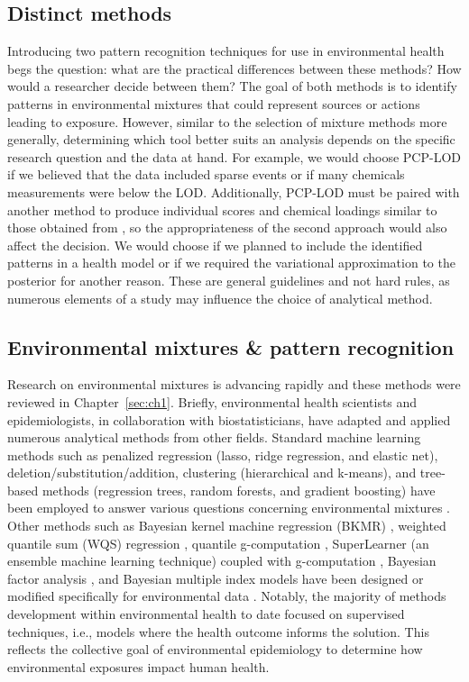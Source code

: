 \subsection{Distinct methods}\label{sec:difference}
Introducing two pattern recognition techniques for use in environmental health begs the question: what are the practical differences between these methods? How would a researcher decide between them? The goal of both methods is to identify patterns in environmental mixtures that could represent sources or actions leading to exposure.  However, similar to the selection of mixture methods more generally, determining which tool better suits an analysis depends on the specific research question and the data at hand. For example, we would choose PCP-LOD if we believed that the data included sparse events or if many chemicals measurements were below the LOD. Additionally, PCP-LOD must be paired with another method to produce individual scores and chemical loadings similar to those obtained from \bnmfc, so the appropriateness of the second approach would also affect the decision. We would choose \bnmf if we planned to include the identified patterns in a health model or if we required the variational approximation to the posterior for another reason. These are general guidelines and not hard rules, as numerous elements of a study may influence the choice of analytical method.

\subsection{Environmental mixtures \& pattern recognition}
\label{sec:mixtures}
Research on environmental mixtures is advancing rapidly and these methods were reviewed in Chapter~\ref{sec:ch1}. Briefly, environmental health scientists and epidemiologists, in collaboration with biostatisticians, have adapted and applied numerous analytical methods from other fields. Standard machine learning methods such as penalized regression (lasso, ridge regression, and elastic net), deletion/substitution/addition, clustering (hierarchical and k-means), and tree-based methods (regression trees, random forests, and gradient boosting) have been employed to answer various questions concerning environmental mixtures \citep{tanner2020environmental, oskar2020machine, choirat2019data, vuong2020chemical, lazarevic2019statistical, coker2018multi, hamra2018environmental, huang2018cumulative, stafoggia2017statistical}. Other methods such as Bayesian kernel machine regression (BKMR) \citep{bobb2014bayesian, bobb2018statistical}, weighted quantile sum (WQS) regression \citep{carrico15}, quantile g-computation \citep{keil2020quantile}, SuperLearner (an ensemble machine learning technique) coupled with g-computation \citep{oulhote2019joint}, Bayesian factor analysis \citep{ferrari2020bayesian, bhattacharya2011sparse}, and Bayesian multiple index models have been designed or modified specifically for environmental data \citep{mcgee2021bayesian}. Notably, the majority of methods development within environmental health to date focused on supervised techniques, i.e., models where the health outcome informs the solution. This reflects the collective goal of environmental epidemiology to determine how environmental exposures impact human health.

